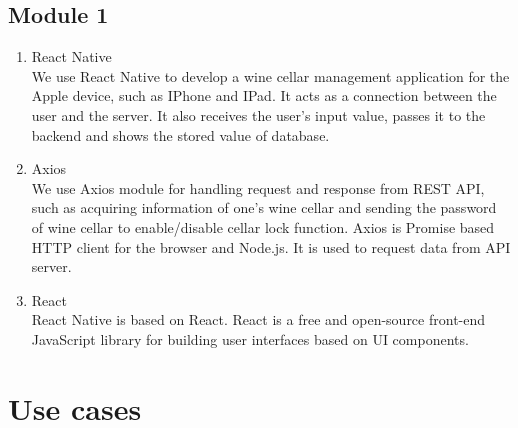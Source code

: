\documentclass[conference]{IEEEtran}
\numberwithin{figure}{subsection}
\begin{document}
\subsection{Module 1}
\begin{enumerate}
    \item React Native\\
    We use React Native to develop a wine cellar management application for the Apple device, such as IPhone and IPad. It acts as a connection between the user and the server. It also receives the user’s input value, passes it to the backend and shows the stored value of database. 
    \item Axios\\
    We use Axios module for handling request and response from REST API, such as acquiring information of one's wine cellar and sending the password of wine cellar to enable/disable cellar lock function. Axios is Promise based HTTP client for the browser and Node.js. It is used to request data from API server.
    \item React\\
    React Native is based on React. 
    React is a free and open-source front-end JavaScript library for building user interfaces based on UI components. 
\end{enumerate}
    
\section{Use cases}
\end{document}
